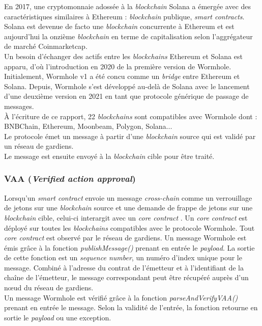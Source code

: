 En 2017, une cryptomonnaie adossée à la \textit{\gls{blockchain}} \gls{Solana} a émergée avec des caractéristiques
similaires à \gls{Ethereum} : \textit{\gls{blockchain}} publique, \textit{\gls{smart contract}s}.\\
Solana est devenue de facto une \textit{\gls{blockchain}} concurrente à \gls{Ethereum} et est aujourd'hui 
la onzième \textit{\gls{blockchain}} en terme de capitalisation selon l'aggrégateur de marché Coinmarketcap.\\
Un besoin d'échanger des \gls{actif}s entre les \textit{\gls{blockchain}s} \gls{Ethereum} et Solana est apparu, 
d'où l'introduction en 2020 de la première version de \gls{Wormhole}.
Initialement, \gls{Wormhole} v1 a été concu comme un \textit{\gls{bridge}} entre \gls{Ethereum} et Solana.
Depuis, \gls{Wormhole} s'est développé au-delà de Solana avec le lancement d'une deuxième version en 2021 
en tant que protocole générique de passage de messages.\\
À l'écriture de ce rapport, 22 \cite{wormholeNetwork} \textit{\gls{blockchain}s} sont compatibles avec \gls{Wormhole} 
dont : BNBChain, \gls{Ethereum}, Moonbeam, Polygon, Solana...\\
Le protocole émet un message à partir d'une \textit{\gls{blockchain}} source qui est validé par un réseau de 
gardiens.\\ 
Le message est ensuite envoyé à la \textit{\gls{blockchain}} cible pour être traité.

\subsubsection{VAA (\textit{Verified action approval})}

Lorsqu'un \textit{\gls{smart contract}} envoie un message \textit{\gls{cross-chain}} comme un verrouillage
de jetons sur une \textit{\gls{blockchain}} source et une demande de frappe de jetons sur une 
\textit{\gls{blockchain}} cible, celui-ci interargit avec un \textit{core contract} \cite{wormholeCoreContract}.
Un \textit{core contract} est déployé sur toutes les \textit{\gls{blockchain}s} compatibles avec le protocole 
\gls{Wormhole}. Tout \textit{core contract} est observé par le réseau de gardiens.
Un message \gls{Wormhole} est émis grâce à la fonction \textit{publishMessage()} prenant en entrée le \textit{payload}.
La sortie de cette fonction est un \textit{sequence number}, un numéro d'index unique pour le message.
Combiné à l'adresse du contrat de l'émetteur et à l'identifiant de la chaîne de l'émetteur, le message 
correspondant peut être récupéré auprès d'un nœud du réseau de gardiens.\\
Un message \gls{Wormhole} est vérifié grâce à la fonction \textit{parseAndVerifyVAA()} prenant en entrée le message.
Selon la validité de l'entrée, la fonction retourne en sortie le \textit{payload} ou une exception.

